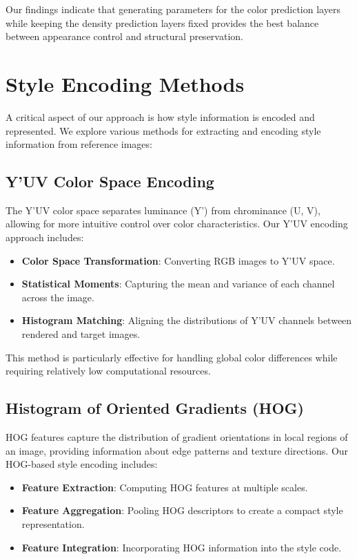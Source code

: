 Our findings indicate that generating parameters for the color prediction layers while keeping the density prediction layers fixed provides the best balance between appearance control and structural preservation.

\section{Style Encoding Methods}

A critical aspect of our approach is how style information is encoded and represented. We explore various methods for extracting and encoding style information from reference images:

\subsection{Y'UV Color Space Encoding}

The Y'UV color space separates luminance (Y') from chrominance (U, V), allowing for more intuitive control over color characteristics. Our Y'UV encoding approach includes:

\begin{itemize}
    \item \textbf{Color Space Transformation}: Converting RGB images to Y'UV space.
    
    \item \textbf{Statistical Moments}: Capturing the mean and variance of each channel across the image.
    
    \item \textbf{Histogram Matching}: Aligning the distributions of Y'UV channels between rendered and target images.
\end{itemize}

This method is particularly effective for handling global color differences while requiring relatively low computational resources.

\subsection{Histogram of Oriented Gradients (HOG)}

HOG features capture the distribution of gradient orientations in local regions of an image, providing information about edge patterns and texture directions. Our HOG-based style encoding includes:

\begin{itemize}
    \item \textbf{Feature Extraction}: Computing HOG features at multiple scales.
    
    \item \textbf{Feature Aggregation}: Pooling HOG descriptors to create a compact style representation.
    
    \item \textbf{Feature Integration}: Incorporating HOG information into the style code.
\end{itemize}

